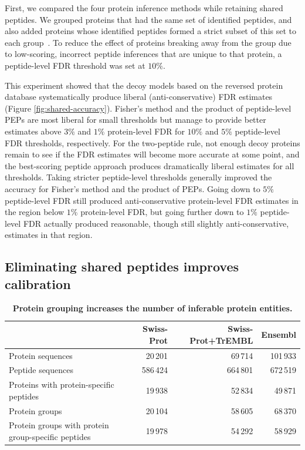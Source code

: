 \documentclass{article}
\begin{document}
First, we compared the four protein inference methods while retaining
shared peptides. We grouped proteins that had the same set of
identified peptides, and also added proteins whose identified peptides
formed a strict subset of this set to each
group~\cite{nesvizhskii2005interpretation, serang2012review}.
To reduce the effect of proteins breaking away from the
group due to low-scoring, incorrect peptide inferences that are
unique to that protein, a peptide-level FDR threshold was set at
$10\%$.

This experiment showed that the decoy models based on the reversed
protein database systematically produce liberal (anti-conservative)
FDR estimates (Figure \ref{fig:shared-accuracy}). Fisher's method and
the product of peptide-level PEPs are most liberal for small
thresholds but manage to provide better estimates above $3\%$
and $1\%$ protein-level FDR for $10\%$ and $5\%$ peptide-level
FDR thresholds, respectively. For the two-peptide rule, not enough
decoy proteins remain to see if the FDR estimates will become more
accurate at some point, and the best-scoring peptide approach produces
dramatically liberal estimates for all thresholds. Taking stricter
peptide-level thresholds generally improved the accuracy for Fisher's
method and the product of PEPs. Going down to $5\%$ peptide-level FDR
still produced anti-conservative protein-level FDR estimates in the
region below $1\%$ protein-level FDR, but going further down to $1\%$
peptide-level FDR actually produced reasonable, though still slightly
anti-conservative, estimates in that region.

\subsection*{Eliminating shared peptides improves calibration}

\begin{table}
\caption{\label{tab:duplicate-proteins}\textbf{Protein grouping
    increases the number of inferable protein entities.}}
\scriptsize
\begin{center}
\begin{tabular}{lrrr}
\hline
& Swiss-Prot & Swiss-Prot+TrEMBL & Ensembl\\
\hline
Protein sequences & 20\,201 & 69\,714 & 101\,933\\
Peptide sequences & 586\,424 & 664\,801 & 672\,519\\
Proteins with protein-specific peptides & 19\,938 & 52\,834 &
49\,871\\
Protein groups & 20\,104 & 58\,605 & 68\,370\\
Protein groups with protein group-specific peptides & 19\,978 &
54\,292 & 58\,929\\
\hline
\end{tabular}
\end{center}
\end{table}
\end{document}
